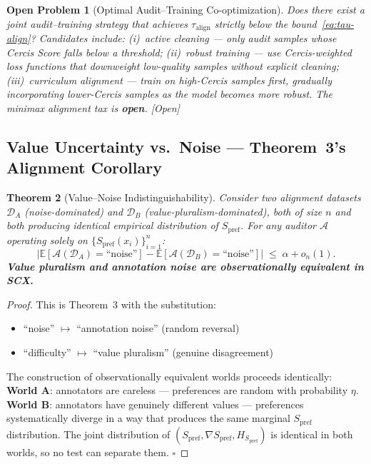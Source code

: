 \documentclass[12pt,a4paper]{article}
\newtheorem{theorem}{Theorem}[section]
\newtheorem{openproblem}[theorem]{Open Problem}
\newcommand{\openquest}{\textcolor{red!70!black}{\small\textsf{[Open]}}}
\newcommand{\E}{\mathbb{E}}
\newcommand{\cD}{\mathcal{D}}
\newcommand{\cA}{\mathcal{A}}
\begin{document}
\begin{openproblem}[Optimal Audit--Training Co-optimization]
\label{prob:joint-opt}
Does there exist a joint audit--training strategy that achieves
$\tau_{\mathrm{align}}$ strictly below the bound~\eqref{eq:tau-align}?
Candidates include: (i)~active cleaning — only audit samples whose Cercis Score
falls below a threshold; (ii)~robust training — use Cercis-weighted loss
functions that downweight low-quality samples without explicit cleaning;
(iii)~curriculum alignment — train on high-Cercis samples first, gradually
incorporating lower-Cercis samples as the model becomes more robust.
The minimax alignment tax is \textbf{open}.  \openquest
\end{openproblem}

\subsection{Value Uncertainty vs.\ Noise — Theorem~3's Alignment Corollary}

\begin{theorem}[Value--Noise Indistinguishability]
\label{thm:value-noise}
Consider two alignment datasets $\cD_A$ (noise-dominated) and $\cD_B$
(value-pluralism-dominated), both of size $n$ and both producing identical
empirical distribution of $S_{\mathrm{pref}}$.  For any auditor $\cA$ operating
solely on $\{S_{\mathrm{pref}}(x_i)\}_{i=1}^n$:
\begin{equation}\label{eq:value-noise}
    \big|\E[\cA(\cD_A)=\text{``noise''}] -
     \E[\cA(\cD_B)=\text{``noise''}]\big|
    \;\leq\; \alpha + o_n(1).
\end{equation}
\textbf{Value pluralism and annotation noise are observationally equivalent
in SCX.}
\end{theorem}

\begin{proof}
This is Theorem~3 with the substitution:
\begin{itemize}
    \item ``noise'' $\mapsto$ ``annotation noise'' (random reversal)
    \item ``difficulty'' $\mapsto$ ``value pluralism'' (genuine disagreement)
\end{itemize}
The construction of observationally equivalent worlds proceeds identically:
\textbf{World A}: annotators are careless — preferences are random with
probability $\eta$.  \textbf{World B}: annotators have genuinely different
values — preferences systematically diverge in a way that produces the same
marginal $S_{\mathrm{pref}}$ distribution.  The joint distribution of
$(S_{\mathrm{pref}},\nabla S_{\mathrm{pref}},H_{S_{\mathrm{pref}}})$ is
identical in both worlds, so no test can separate them. $\square$
\end{proof}
\end{document}
